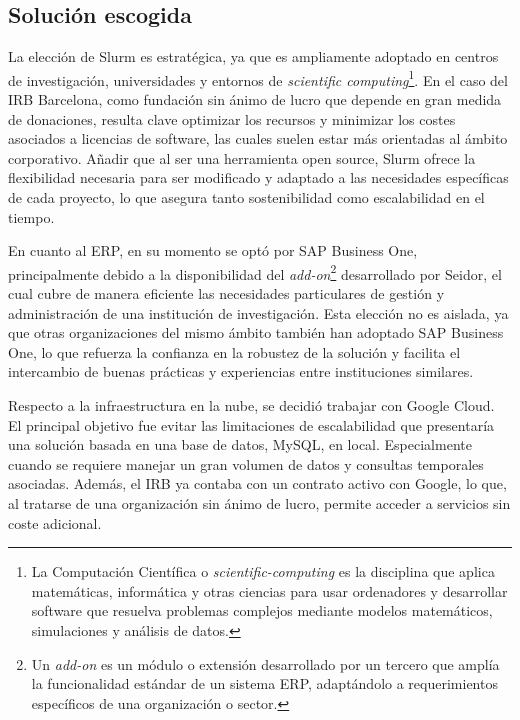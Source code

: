 \subsection{Solución escogida}
La elección de Slurm es estratégica, ya que es ampliamente adoptado en centros de investigación, universidades y entornos 
de \textit{scientific computing}\footnote{La Computación Científica o \textit{scientific-computing} es la disciplina que aplica matemáticas, 
informática y otras ciencias para usar ordenadores y desarrollar software que resuelva problemas complejos mediante modelos matemáticos, 
simulaciones y análisis de datos.}. En el caso del IRB Barcelona, como fundación sin ánimo de lucro que depende en gran medida de donaciones, 
resulta clave optimizar los recursos y minimizar los costes asociados a licencias de software, las cuales suelen estar más orientadas 
al ámbito corporativo. Añadir que al ser una herramienta open source, Slurm ofrece la flexibilidad necesaria para ser modificado y adaptado 
a las necesidades específicas de cada proyecto, lo que asegura tanto sostenibilidad como escalabilidad en el tiempo.

En cuanto al ERP, en su momento se optó por SAP Business One, principalmente debido a la disponibilidad del \textit{add-on}\footnote{Un \textit{add-on} es 
un módulo o extensión desarrollado por un tercero que amplía la funcionalidad estándar de un sistema ERP, adaptándolo a requerimientos específicos de una 
organización o sector.} desarrollado por Seidor, el cual cubre de manera eficiente las necesidades particulares de gestión y administración de una institución 
de investigación. Esta elección no es aislada, ya que otras organizaciones del mismo ámbito también han adoptado SAP Business One, lo que refuerza la confianza 
en la robustez de la solución y facilita el intercambio de buenas prácticas y experiencias entre instituciones similares.

Respecto a la infraestructura en la nube, se decidió trabajar con Google Cloud. El principal objetivo fue evitar las limitaciones de escalabilidad
que presentaría una solución basada en una base de datos, MySQL, en local. Especialmente cuando se requiere manejar un gran volumen de datos y consultas 
temporales asociadas. Además, el IRB ya contaba con un contrato activo con Google, lo que, al tratarse de una organización sin ánimo de lucro, permite 
acceder a servicios sin coste adicional.

